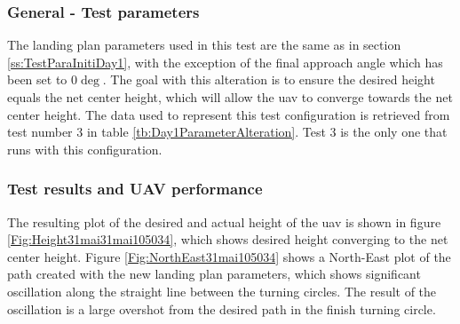\subsubsection{General - Test parameters}
The landing plan parameters used in this test are the same as in section \ref{ss:TestParaInitiDay1}, with the exception of the final approach angle which has been set to $0 \deg$. The goal with this alteration is to ensure the desired height equals the net center height, which will allow the \gls{uav} to converge towards the net center height. The data used to represent this test configuration is retrieved from test number $3$ in table \ref{tb:Day1ParameterAlteration}. Test $3$ is the only one that runs with this configuration.
\subsubsection{Test results and UAV performance}
 The resulting plot of the desired and actual height of the \gls{uav} is shown in figure \ref{Fig:Height31mai31mai105034}, which shows desired height converging to the net center height. Figure \ref{Fig:NorthEast31mai105034} shows a North-East plot of the path created with the new landing plan parameters, which shows significant oscillation along the straight line between the turning circles. The result of the oscillation is a large overshot from the desired path in the finish turning circle.
 \newpage
